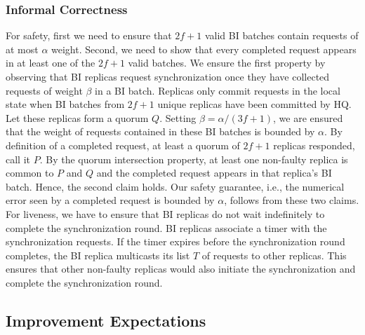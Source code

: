 \documentclass[twocolumn,10pt]{article}
\begin{document}

\subsubsection{Informal Correctness}

For safety, first we need to ensure that $2f+1$
valid BI batches contain requests of at most $\alpha$ weight. Second, we 
need to show that every completed request appears in at least one of the $2f+1$
valid batches. We ensure the first property by observing
that BI replicas request synchronization
once they have collected requests of weight $\beta$ in a BI batch.  Replicas
only commit requests in the local state when BI batches from $2f+1$ unique replicas 
have been committed by HQ. Let these replicas form a quorum $Q$.  Setting
$\beta=\alpha/(3f+1)$, we are ensured that the weight of requests
contained in these BI batches is bounded by $\alpha$. 
By definition of a
completed request, at least a quorum of $2f+1$ replicas responded,
call it $P$. By the quorum intersection property, at least one
non-faulty replica is common to $P$ and $Q$ and the completed request
appears in that replica's BI batch. Hence, the second claim holds. Our safety
guarantee, i.e., the numerical error seen by a completed request is bounded by $\alpha$, 
follows from these two claims.
For liveness, we have to ensure that BI replicas do not wait indefinitely
to complete the synchronization round. 
BI replicas associate a timer with the synchronization requests. If the timer expires
before the synchronization round completes, the BI replica multicasts its list $T$ of 
requests to other replicas. This ensures that other non-faulty replicas would also initiate
the synchronization and complete the synchronization round.










\subsection{Improvement Expectations}
\end{document}
